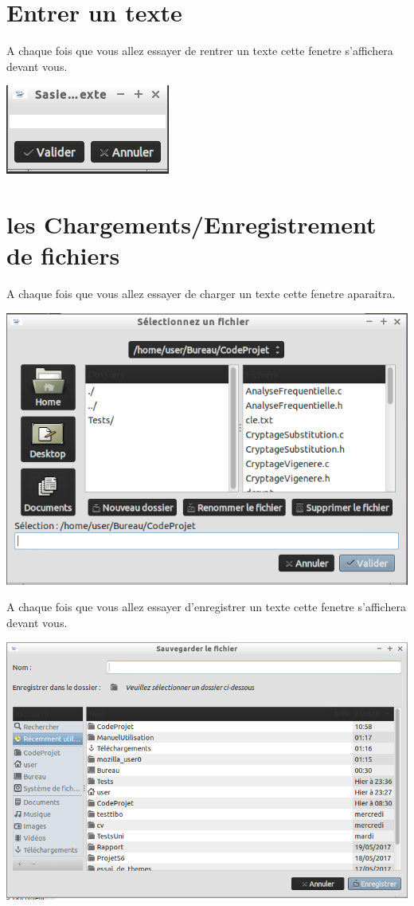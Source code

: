 \documentclass[a4]{article}
\begin{document}
	\section{Entrer un texte}
		A chaque fois que vous allez essayer de rentrer un texte cette fenetre s'affichera devant vous.
		\begin{center}\includegraphics[scale=0.4]{21.png}\end{center}
	\section{les Chargements/Enregistrement de fichiers}
		A chaque fois que vous allez essayer de charger un texte cette fenetre aparaitra.			
		\begin{center}\includegraphics[scale=0.4]{19.png}\end{center}
		\newpage
		A chaque fois que vous allez essayer d'enregistrer un texte cette fenetre s'affichera devant vous.

		\begin{center}\includegraphics[scale=0.4]{20.png}\end{center}
\end{document}
